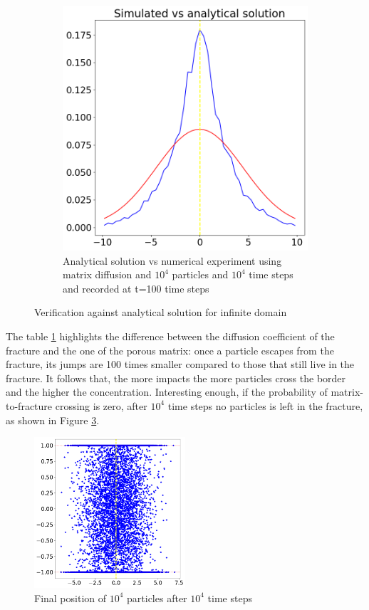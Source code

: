\documentclass{article}
\begin{document}
\begin{figure}[htbp]
\begin{subfigure}[b]{0.45\textwidth}
        \includegraphics[width=\textwidth]{images/verificationMatrixDiffusion.png}
        \caption{Analytical solution vs numerical experiment using matrix diffusion and $10^4$ particles and $10^4$ time steps and recorded at t=100 time steps}
        \label{fig:MatrixDiffusionVerification}
    \end{subfigure}
    \caption{Verification against analytical solution for infinite domain}
    \label{fig:MatrixDiffusion}
\end{figure}
The table \ref{fig:MatrixDiffusionVerification} highlights the difference between the diffusion coefficient of the fracture and the one of the porous matrix: once a particle escapes from the fracture, its jumps are 100 times smaller compared to those that still live in the fracture. It follows that, the more impacts the more particles cross the border and the higher the concentration. Interesting enough, if the probability of matrix-to-fracture crossing is zero, after $10^4$ time steps no particles is left in the fracture, as shown in Figure \ref{fig:finalPosMatrixDiff}.
\begin{figure}[htbp]
    \centering
    \includegraphics[width=0.5\textwidth]{images/finalPositionsMatrixDiffusion.png}
    \caption{Final position of $10^4$ particles after $10^4$ time steps}
    \label{fig:finalPosMatrixDiff}
\end{figure}
\end{document}
